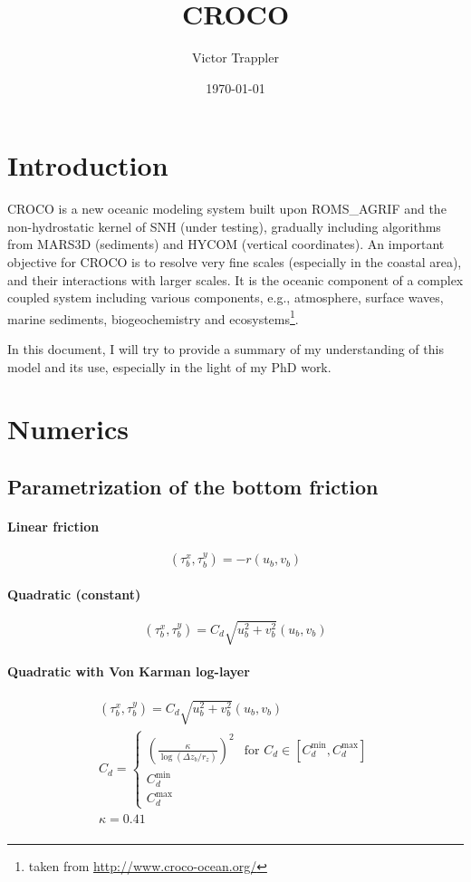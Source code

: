 \documentclass{article}
\author{Victor Trappler}
\title{CROCO}
\date{\today}
\begin{document}
\maketitle

\section*{Introduction}

CROCO is a new oceanic modeling system built upon ROMS\_AGRIF and the non-hydrostatic kernel of SNH (under testing), gradually including algorithms from MARS3D (sediments)  and HYCOM (vertical coordinates). An important objective for CROCO is to resolve very fine scales (especially in the coastal area), and their interactions with larger scales. It is the oceanic component of a complex coupled system including various components, e.g., atmosphere, surface waves, marine sediments, biogeochemistry and ecosystems\footnote{taken from \url{http://www.croco-ocean.org/}}.

In this document, I will try to provide a summary of my understanding of this model and its use, especially in the light of my PhD work.
\section{Numerics}
\subsection{Parametrization of the bottom friction}
\paragraph{Linear friction}
\begin{equation}
  \label{eq:linear_friction}
  (\tau_b^x, \tau_b^y) = -r (u_b, v_b)
\end{equation}
\paragraph{Quadratic (constant)}
\begin{equation}
  \label{eq:quadratic_friction_constant}
  (\tau_b^x, \tau_b^y) = C_d \sqrt{u_b^2 + v_b^2}(u_b, v_b)
\end{equation}
\paragraph{Quadratic with Von Karman log-layer}
\begin{align}
  \label{eq:quadratic_friction_vonkarman}
  (\tau_b^x, \tau_b^y) = C_d \sqrt{u_b^2 + v_b^2}(u_b, v_b) \\  
  C_d = \left\{\begin{array}{ll}
                 {\left(\frac{\kappa}{\log({\Delta z_b}/{r_z})}\right)}^2 & \text{for } C_d \in [C_d^{\min}, C_d^{\max}] \\
                 C_d^{\min} & \\
                 C_d^{\max}
       \end{array}
  \right. \\
  \kappa=0.41 \\  
\end{align}
\end{document}
